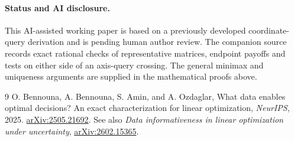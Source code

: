\documentclass[11pt]{article}
\begin{document}
\paragraph{Status and AI disclosure.}
This AI-assisted working paper is based on a previously developed
coordinate-query derivation and is pending human author review.
The companion source records exact rational checks of representative
matrices, endpoint payoffs and tests on either side of an axis-query crossing. The general
minimax and uniqueness arguments are supplied in the mathematical
proofs above.

\begin{thebibliography}{9}
O. Bennouna, A. Bennouna, S. Amin, and A. Ozdaglar,
What data enables optimal decisions? An exact characterization for
linear optimization, \emph{NeurIPS}, 2025.
\href{https://arxiv.org/abs/2505.21692}{arXiv:2505.21692}.
See also \emph{Data informativeness in linear optimization under
uncertainty}, \href{https://arxiv.org/abs/2602.15365}{arXiv:2602.15365}.
\end{thebibliography}
\end{document}
